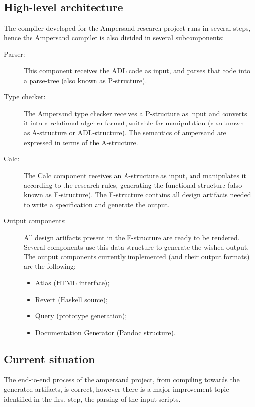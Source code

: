 \subsection{High-level architecture}
\label{subsec:architecture}
The compiler developed for the Ampersand research project runs in several steps, hence the Ampersand compiler is also divided in several subcomponents:
%
%
%
%
\begin{description}
	\item[Parser:] This component receives the ADL code as input, and parses that code into a parse-tree (also known as P-structure).
	\item[Type checker:] The Ampersand type checker receives a P-structure as input and converts it into a relational algebra format, suitable for manipulation (also known as A-structure or ADL-structure).
		 The semantics of ampersand are expressed in terms of the A-structure.
	\item[Calc:] The Calc component receives an A-structure as input, and manipulates it according to the research rules, generating the functional structure (also known as F-structure).
		The F-structure contains all design artifacts needed to write a specification and generate the output.
	\item[Output components:] All design artifacts present in the F-structure are ready to be rendered.
		Several components use this data structure to generate the wished output.
		The output components currently implemented (and their output formats) are the following: 
		\begin{itemize}
			\item Atlas (HTML interface);
			\item Revert (Haskell source);
			\item Query (prototype generation);
			\item Documentation Generator (Pandoc structure).
		\end{itemize}
\end{description}

\subsection{Current situation}
The end-to-end process of the ampersand project, from compiling towards the generated artifacts, is correct, however there is a major improvement topic identified in the first step, the parsing of the input scripts.

